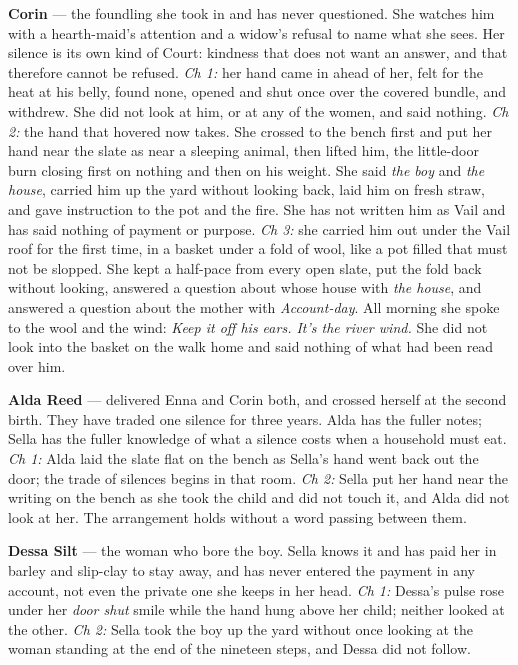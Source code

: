 \documentclass{design/chronicle}
\begin{document}
{\textbf{Corin} — the foundling she took in and has never questioned. She watches him with a hearth-maid’s attention and a widow’s refusal to name what she sees. Her silence is its own kind of Court: kindness that does not want an answer, and that therefore cannot be refused. \emph{Ch 1:} her hand came in ahead of her, felt for the heat at his belly, found none, opened and shut once over the covered bundle, and withdrew. She did not look at him, or at any of the women, and said nothing. \emph{Ch 2:} the hand that hovered now takes. She crossed to the bench first and put her hand near the slate as near a sleeping animal, then lifted him, the little-door burn closing first on nothing and then on his weight. She said \emph{the boy} and \emph{the house}, carried him up the yard without looking back, laid him on fresh straw, and gave instruction to the pot and the fire. She has not written him as Vail and has said nothing of payment or purpose. \emph{Ch 3:} she carried him out under the Vail roof for the first time, in a basket under a fold of wool, like a pot filled that must not be slopped. She kept a half-pace from every open slate, put the fold back without looking, answered a question about whose house with \emph{the house}, and answered a question about the mother with \emph{Account-day}. All morning she spoke to the wool and the wind: \emph{Keep it off his ears. It’s the river wind.} She did not look into the basket on the walk home and said nothing of what had been read over him.

\textbf{Alda Reed} — delivered Enna and Corin both, and crossed herself at the second birth. They have traded one silence for three years. Alda has the fuller notes; Sella has the fuller knowledge of what a silence costs when a household must eat. \emph{Ch 1:} Alda laid the slate flat on the bench as Sella’s hand went back out the door; the trade of silences begins in that room. \emph{Ch 2:} Sella put her hand near the writing on the bench as she took the child and did not touch it, and Alda did not look at her. The arrangement holds without a word passing between them.

\textbf{Dessa Silt} — the woman who bore the boy. Sella knows it and has paid her in barley and slip-clay to stay away, and has never entered the payment in any account, not even the private one she keeps in her head. \emph{Ch 1:} Dessa’s pulse rose under her \emph{door shut} smile while the hand hung above her child; neither looked at the other. \emph{Ch 2:} Sella took the boy up the yard without once looking at the woman standing at the end of the nineteen steps, and Dessa did not follow.

}
\end{document}
